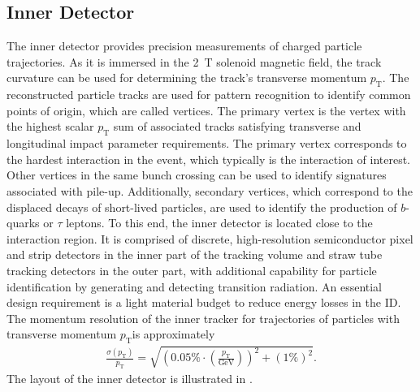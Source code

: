 \subsection{Inner Detector}
\label{sec:ATLAS-ID}
The inner detector provides precision measurements of charged particle trajectories. As it is immersed in the \SI{2}{\tesla} solenoid magnetic field, the track curvature can be used for determining the track's transverse momentum \(p_{\text{T}}\).
The reconstructed particle tracks are used for pattern recognition to identify common points of origin, which are called vertices. The primary vertex is the vertex with the highest scalar \(p_{\text{T}}\) sum of associated tracks satisfying transverse and longitudinal impact parameter requirements. The primary vertex corresponds to the hardest interaction in the event, which typically is the interaction of interest. Other vertices in the same bunch crossing can be used to identify signatures associated with pile-up. Additionally, secondary vertices, which correspond to the displaced decays of short-lived particles, are used to identify the production of \(b\)-quarks or \(\tau\) leptons.
To this end, the inner detector is located close to the interaction region. It is comprised of discrete, high-resolution semiconductor pixel and strip detectors in the inner part of the tracking volume and straw tube tracking detectors in the outer part, with additional capability for particle identification by generating and detecting transition radiation. An essential design requirement is a light material budget to reduce energy losses in the ID.
The momentum resolution of the inner tracker for trajectories of particles with transverse momentum \(p_{\text{T}}\)is approximately
\begin{align}
    \frac{\sigma(p_{\text{T}})}{p_{\text{T}}} = \sqrt{\left(0.05 \% \cdot \left(\frac{p_{\text{T}}}{\si{\giga\electronvolt}}\right)\right)^2 + \left(1 \%\right)^2}.
\end{align}
The layout of the inner detector is illustrated in .

